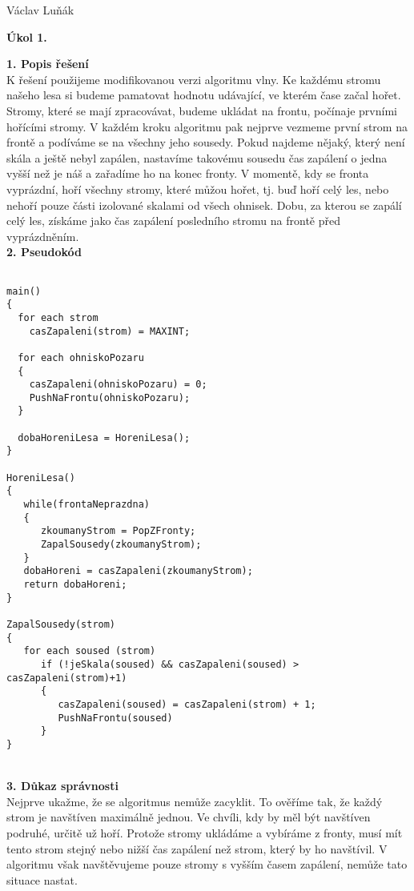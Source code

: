 \documentclass[11pt,a4paper]{report}
\begin{document}
\begin{flushright}
Václav Luňák
\end{flushright}
\begin{LARGE}
\textbf{Úkol 1.} \\
\end{LARGE}

\textbf{1. Popis řešení} \\

K řešení použijeme modifikovanou verzi algoritmu vlny. Ke každému stromu našeho lesa si budeme pamatovat hodnotu udávající, ve kterém čase začal hořet. Stromy, které se mají zpracovávat, budeme ukládat na frontu, počínaje prvními hořícími stromy. V každém kroku algoritmu pak nejprve vezmeme první strom na frontě a podíváme se na všechny jeho sousedy. Pokud najdeme nějaký, který není skála a ještě nebyl zapálen, nastavíme takovému sousedu čas zapálení o jedna vyšší než je náš a zařadíme ho na konec fronty. V momentě, kdy se fronta vyprázdní, hoří všechny stromy, které můžou hořet, tj. buď hoří celý les, nebo nehoří pouze části izolované skalami od všech ohnisek. Dobu, za kterou se zapálí celý les, získáme jako čas zapálení posledního stromu na frontě před vyprázdněním. \\

\textbf{2. Pseudokód} 
\begin{verbatim}

main()
{
  for each strom 
    casZapaleni(strom) = MAXINT;
  
  for each ohniskoPozaru
  {
    casZapaleni(ohniskoPozaru) = 0;
    PushNaFrontu(ohniskoPozaru);
  }
  
  dobaHoreniLesa = HoreniLesa();
}

HoreniLesa()
{
   while(frontaNeprazdna)
   {
      zkoumanyStrom = PopZFronty;
      ZapalSousedy(zkoumanyStrom);
   }
   dobaHoreni = casZapaleni(zkoumanyStrom);
   return dobaHoreni;
}

ZapalSousedy(strom)
{
   for each soused (strom)
      if (!jeSkala(soused) && casZapaleni(soused) > casZapaleni(strom)+1)
      {
         casZapaleni(soused) = casZapaleni(strom) + 1;
         PushNaFrontu(soused)
      }
}
\end{verbatim}
\textbf{}\\ 
\textbf{3. Důkaz správnosti} \\

Nejprve ukažme, že se algoritmus nemůže zacyklit. To ověříme tak, že každý strom je navštíven maximálně jednou. Ve chvíli, kdy by měl být navštíven podruhé, určitě už hoří. Protože stromy ukládáme a vybíráme z fronty, musí mít tento strom stejný nebo nižší čas zapálení než strom, který by ho navštívil. V algoritmu však navštěvujeme pouze stromy s vyšším časem zapálení, nemůže tato situace nastat.\\
\end{document}
